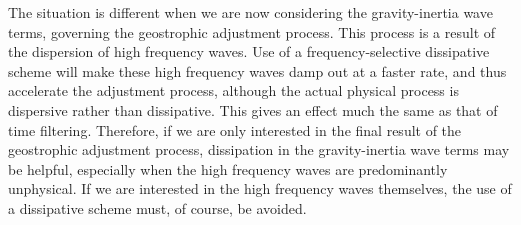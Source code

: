 The situation is different when we are now considering the gravity-inertia wave terms, governing the geostrophic adjustment process. This process is a result of the dispersion of high frequency waves. Use of a frequency-selective dissipative scheme will make these high frequency waves damp out at a faster rate, and thus accelerate the adjustment process, although the actual physical process is dispersive rather than dissipative. This gives an effect much the same as that of time filtering. Therefore, if we are only interested in the final result of the geostrophic adjustment process, dissipation in the gravity-inertia wave terms may be helpful, especially when the high frequency waves are predominantly unphysical. If we are interested in the high frequency waves themselves, the use of a dissipative scheme must, of course, be avoided.


